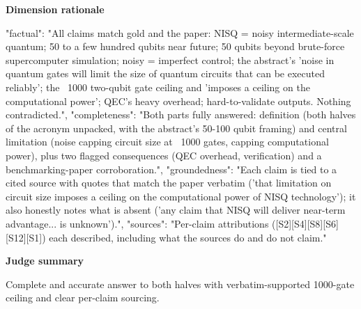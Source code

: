 \documentclass[10pt]{article}
\begin{document}
\textbf{Dimension rationale}
\begin{EvidenceText}
{
  "factual": "All claims match gold and the paper: NISQ = noisy intermediate-scale quantum; 50 to a few hundred qubits near future; 50 qubits beyond brute-force supercomputer simulation; noisy = imperfect control; the abstract's 'noise in quantum gates will limit the size of quantum circuits that can be executed reliably'; the ~1000 two-qubit gate ceiling and 'imposes a ceiling on the computational power'; QEC's heavy overhead; hard-to-validate outputs. Nothing contradicted.",
  "completeness": "Both parts fully answered: definition (both halves of the acronym unpacked, with the abstract's 50-100 qubit framing) and central limitation (noise capping circuit size at ~1000 gates, capping computational power), plus two flagged consequences (QEC overhead, verification) and a benchmarking-paper corroboration.",
  "groundedness": "Each claim is tied to a cited source with quotes that match the paper verbatim ('that limitation on circuit size imposes a ceiling on the computational power of NISQ technology'); it also honestly notes what is absent ('any claim that NISQ will deliver near-term advantage... is unknown').",
  "sources": "Per-claim attributions ([S2][S4][S8][S6][S12][S1]) each described, including what the sources do and do not claim."
}
\end{EvidenceText}

\textbf{Judge summary}
\begin{EvidenceText}
Complete and accurate answer to both halves with verbatim-supported 1000-gate ceiling and clear per-claim sourcing.
\end{EvidenceText}
\end{document}
